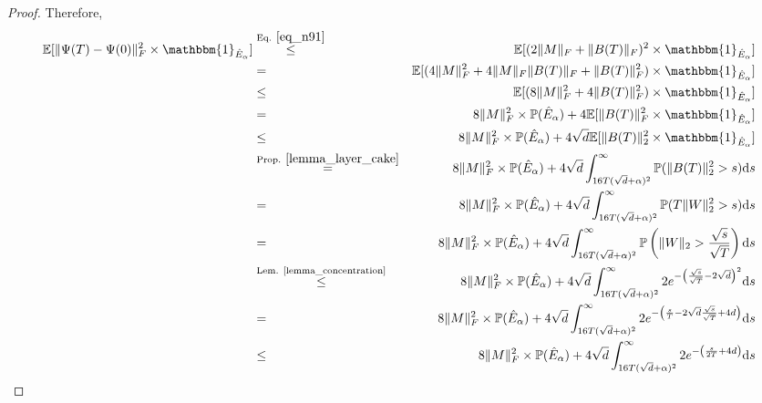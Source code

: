 \documentclass[11pt,letterpaper]{article}
\begin{document}
\begin{proof}
%
Therefore,
%
\begin{eqnarray}
    \mathbb{E}[\|\Psi(T) - \Psi(0)\|_F^2 \times \mathbbm{1}_{\hat{E}_\alpha}] 
    &\stackrel{\textrm{Eq. } \eqref{eq_n91}}{\leq} & \mathbb{E}[ (2\|M\|_F +\|B(T)\|_F)^2\times \mathbbm{1}_{\hat{E}_\alpha}]\nonumber\\
    & = & \mathbb{E}[ (4\|M\|_F^2 +4 \|M\|_F \|B(T)\|_F + \|B(T)\|_F^2)\times \mathbbm{1}_{\hat{E}_\alpha}]\nonumber\\
        &\leq & \mathbb{E}[ (8\|M\|_F^2 + 4\|B(T)\|_F^2)\times \mathbbm{1}_{\hat{E}_\alpha}] \label{eq_n97}\\
    &= & 8\|M\|_F^2\times \mathbb{P}(\hat{E}_\alpha)+ 4\mathbb{E}[\|B(T)\|_F^2\times \mathbbm{1}_{\hat{E}_\alpha}] \nonumber\\
      &\leq & 8\|M\|_F^2\times \mathbb{P}(\hat{E}_\alpha)+ 4\sqrt{d}\mathbb{E}[\|B(T)\|_2^2\times \mathbbm{1}_{\hat{E}_\alpha}]\nonumber\\
      &\stackrel{\textrm{Prop. } \ref{lemma_layer_cake}}{=}&  8\|M\|_F^2\times \mathbb{P}(\hat{E}_\alpha)+ 4\sqrt{d} \int_{16T(\sqrt{d} + \alpha)^2}^\infty\mathbb{P}(\|B(T)\|_2^2 >s)\mathrm{d}s \nonumber\\
            &=& 8\|M\|_F^2\times \mathbb{P}(\hat{E}_\alpha)+ 4\sqrt{d} \int_{16T(\sqrt{d} + \alpha)^2}^\infty\mathbb{P}(T\|W\|_2^2 >s)\mathrm{d}s \label{eq_n98}\\
             &=& 8\|M\|_F^2\times \mathbb{P}(\hat{E}_\alpha)+ 4\sqrt{d} \int_{16T(\sqrt{d} + \alpha)^2}^\infty\mathbb{P}\left(\|W\|_2 >\frac{\sqrt{s}}{\sqrt{T}}\right)\mathrm{d}s \nonumber\\
                      &\stackrel{\textrm{Lem. \ref{lemma_concentration}}}{\leq} & 8\|M\|_F^2\times \mathbb{P}(\hat{E}_\alpha)+ 4\sqrt{d} \int_{16T(\sqrt{d} + \alpha)^2}^\infty 2e^{-\left(\frac{\sqrt{s}}{\sqrt{T}} -2\sqrt{d}\right)^2}\mathrm{d}s \nonumber\\
                       &=& 8\|M\|_F^2\times \mathbb{P}(\hat{E}_\alpha)+ 4\sqrt{d} \int_{16T(\sqrt{d} + \alpha)^2}^\infty 2e^{-\left(\frac{s}{T} -2\sqrt{d}\frac{\sqrt{s}}{\sqrt{T}} +4d\right)}\mathrm{d}s\nonumber\\
                            &\leq &  8\|M\|_F^2\times \mathbb{P}(\hat{E}_\alpha)+ 4\sqrt{d} \int_{16T(\sqrt{d} + \alpha)^2}^\infty 2e^{-\left(\frac{s}{2T} +4d\right)}\mathrm{d}s \label{eq_n99}\\

\end{eqnarray}
\end{proof}
\end{document}
